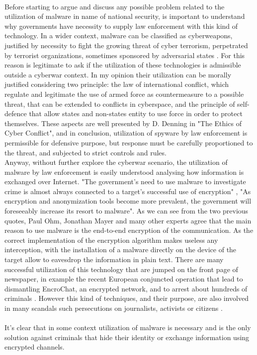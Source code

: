 \paragraph{}
Before starting to argue and discuss any possible problem related to the utilization of malware in name of national security, is important to understand why governments have necessity to supply law enforcement with this kind of technology. In a wider context,  malware can be classified as cyberweapons, justified by necessity to fight the growing threat of cyber terrorism, perpetrated by terrorist organizations, sometimes sponsored by adversarial states \cite{cyber_attacks_and_terrorism}. For this reason is legitimate to ask if the utilization of these technologies is admissible outside a cyberwar context. In my opinion their utilization can be morally justified considering two principle: the law of international conflict, which regulate and legitimate the use of armed force as countermeasure to a possible threat, that can be extended to conflicts in cyberspace, and the principle of self-defence that allow states and non-states entity to use force in order to protect themselves. These aspects are well presented by D. Denning in "The Ethics of Cyber Conflict"\cite{cyber_conflicts}, and in conclusion, utilization of spyware by law enforcement is permissible for defensive purpose, but response must be carefully proportioned to the threat, and subjected to strict controls and rules.\\     
Anyway, without further explore the cyberwar scenario, the utilization of malware by law enforcement is easily understood analysing how information is exchanged over Internet. "The government’s need to use malware to investigate crime is almost always connected to a target’s successful use of encryption" \cite{malware_justification_1}, "As encryption and anonymization tools become more prevalent, the government will foreseeably increase its resort to malware"\cite{malware_justification_2}. As we can see from the two previous quotes, Paul Ohm, Jonathan Mayer and many other experts \cite{malware_justification_3} agree that the main reason to use malware is the end-to-end encryption of the communication. As the correct implementation of the encryption algorithm makes useless any interception, with the installation of a malware directly on the device of the target allow to eavesdrop the information in plain text. There are many successful utilization of this technology that are jumped on the front page of newspaper, in example the recent European conjuncted operation that lead to dismantling EncroChat, an encrypted network, and to arrest about hundreds of criminals \cite{encrochat_1}\cite{encrochat_2}. However this kind of techniques, and their purpose, are also involved in many scandals such persecutions on journalists, activists or citizens \cite{abuse_1}\cite{abuse_2}\cite{abuse_3}. 
\paragraph{}
It's clear that in some context utilization of malware is necessary and is the only solution against criminals that hide their identity or exchange information using encrypted channels.     